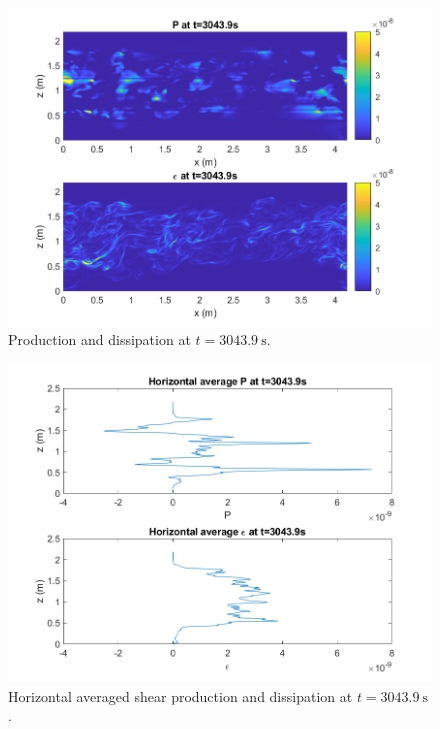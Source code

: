 \documentclass[11pt]{article}
\begin{document}
\begin{enumerate}
\begin{enumerate}
			
			\begin{figure}[htbp]
				\centering
				\includegraphics[width=\textwidth]{1-plots/prod_diss_plot_3043.png}
				\caption{Production and dissipation at $t=\SI{3043.9}{\second}$.}
				\label{fig:prod diss 3043}
			\end{figure}
			
			
			\begin{figure}
				\centering
				\includegraphics[width=\textwidth]{1-plots/Horizontal_prod_diss_plot_3043.png}
				\caption{Horizontal averaged shear production and dissipation at $t=\SI{3043.9}{\second}$.}
				\label{fig:prod diss horiz}
			\end{figure}
			

\end{enumerate}
\end{enumerate}
\end{document}
